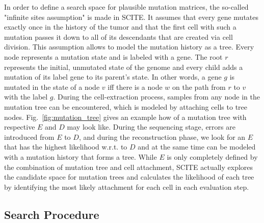 In order to define a search space for plausible mutation matrices, the so-called "infinite sites assumption" is made in SCITE. It assumes that every gene mutates exactly once in the history of the tumor and that the first cell with such a mutation passes it down to all of its descendants that are created via cell division. This assumption allows to model the mutation history as a tree. Every node represents a mutation state and is labeled with a gene. The root $r$ represents the initial, unmutated state of the genome and every child adds a mutation of its label gene to its parent's state. In other words, a gene $g$ is mutated in the state of a node $v$ iff there is a node $w$ on the path from $r$ to $v$ with the label $g$. 
During the cell-extraction process, samples from any node in the mutation tree can be encountered, which is modeled by attaching cells to tree nodes.
Fig.~\ref{fig:mutation_tree} gives an example how of a mutation tree with respective $E$ and $D$ may look like. During the sequencing stage, errors are introduced from $E$ to $D$, and during the reconstruction phase, we look for an $E$ that has the highest likelihood w.r.t. to $D$ and at the same time can be modeled with a mutation history that forms a tree.
While $E$ is only completely defined by the combination of mutation tree and cell attachment, \ac{SCITE} actually explores the candidate space for mutation trees and calculates the likelihood of each tree by identifying the most likely attachment for each cell in each evaluation step.

\subsection{Search Procedure}

